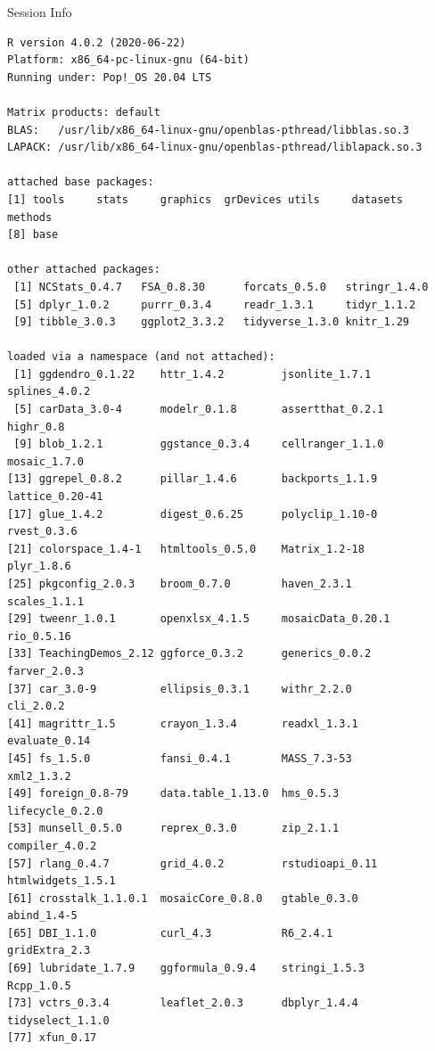 \documentclass[10pt,handout]{beamer}\usepackage[]{graphicx}\usepackage[]{color}
\makeatletter
\newenvironment{kframe}{%
 \def\at@end@of@kframe{}%
 \ifinner\ifhmode%
  \def\at@end@of@kframe{\end{minipage}}%
  \begin{minipage}{\columnwidth}%
 \fi\fi%
 \def\FrameCommand##1{\hskip\@totalleftmargin \hskip-\fboxsep
 \colorbox{shadecolor}{##1}\hskip-\fboxsep
     \hskip-\linewidth \hskip-\@totalleftmargin \hskip\columnwidth}%
 \MakeFramed {\advance\hsize-\width
   \@totalleftmargin\z@ \linewidth\hsize
   \@setminipage}}%
 {\par\unskip\endMakeFramed%
 \at@end@of@kframe}
\newenvironment{knitrout}{}{} %
\makeatother
\begin{document}
\begin{frame}[fragile]{Session Info}
	\tiny
	
\begin{knitrout}\tiny
{}\color{fgcolor}\begin{kframe}
\begin{verbatim}
R version 4.0.2 (2020-06-22)
Platform: x86_64-pc-linux-gnu (64-bit)
Running under: Pop!_OS 20.04 LTS

Matrix products: default
BLAS:   /usr/lib/x86_64-linux-gnu/openblas-pthread/libblas.so.3
LAPACK: /usr/lib/x86_64-linux-gnu/openblas-pthread/liblapack.so.3

attached base packages:
[1] tools     stats     graphics  grDevices utils     datasets  methods  
[8] base     

other attached packages:
 [1] NCStats_0.4.7   FSA_0.8.30      forcats_0.5.0   stringr_1.4.0  
 [5] dplyr_1.0.2     purrr_0.3.4     readr_1.3.1     tidyr_1.1.2    
 [9] tibble_3.0.3    ggplot2_3.3.2   tidyverse_1.3.0 knitr_1.29     

loaded via a namespace (and not attached):
 [1] ggdendro_0.1.22    httr_1.4.2         jsonlite_1.7.1     splines_4.0.2     
 [5] carData_3.0-4      modelr_0.1.8       assertthat_0.2.1   highr_0.8         
 [9] blob_1.2.1         ggstance_0.3.4     cellranger_1.1.0   mosaic_1.7.0      
[13] ggrepel_0.8.2      pillar_1.4.6       backports_1.1.9    lattice_0.20-41   
[17] glue_1.4.2         digest_0.6.25      polyclip_1.10-0    rvest_0.3.6       
[21] colorspace_1.4-1   htmltools_0.5.0    Matrix_1.2-18      plyr_1.8.6        
[25] pkgconfig_2.0.3    broom_0.7.0        haven_2.3.1        scales_1.1.1      
[29] tweenr_1.0.1       openxlsx_4.1.5     mosaicData_0.20.1  rio_0.5.16        
[33] TeachingDemos_2.12 ggforce_0.3.2      generics_0.0.2     farver_2.0.3      
[37] car_3.0-9          ellipsis_0.3.1     withr_2.2.0        cli_2.0.2         
[41] magrittr_1.5       crayon_1.3.4       readxl_1.3.1       evaluate_0.14     
[45] fs_1.5.0           fansi_0.4.1        MASS_7.3-53        xml2_1.3.2        
[49] foreign_0.8-79     data.table_1.13.0  hms_0.5.3          lifecycle_0.2.0   
[53] munsell_0.5.0      reprex_0.3.0       zip_2.1.1          compiler_4.0.2    
[57] rlang_0.4.7        grid_4.0.2         rstudioapi_0.11    htmlwidgets_1.5.1 
[61] crosstalk_1.1.0.1  mosaicCore_0.8.0   gtable_0.3.0       abind_1.4-5       
[65] DBI_1.1.0          curl_4.3           R6_2.4.1           gridExtra_2.3     
[69] lubridate_1.7.9    ggformula_0.9.4    stringi_1.5.3      Rcpp_1.0.5        
[73] vctrs_0.3.4        leaflet_2.0.3      dbplyr_1.4.4       tidyselect_1.1.0  
[77] xfun_0.17         
\end{verbatim}
\end{kframe}
\end{knitrout}
	
\end{frame}
\end{document}
